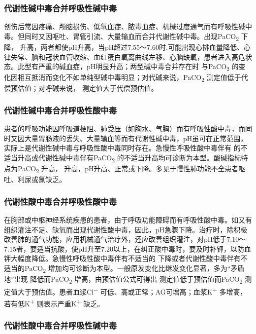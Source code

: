 \subsubsection{代谢性碱中毒合并呼吸性碱中毒}

创伤后常因疼痛、颅脑损伤、低氧血症、脓毒血症、机械过度通气而有呼吸性碱中毒。但同时又因呕吐、胃管引流、大量输血而合并代谢性碱中毒。出现PaCO\textsubscript{2}
下降，{}
升高，两者都使pH升高，当pH超过7.55～7.60时.可能出现心排血量降低、心律失常、脑和冠状血管收缩、血红蛋白氧离曲线左移、心脑缺氧，患者进入高危状态。此型有严重的碱血症，pH明显升高；两型碱中毒合并存在时{}
与PaCO\textsubscript{2}
的变化因相互抵消而变化不如单纯型碱中毒明显；对代碱来说，PaCO\textsubscript{2}
测定值低于代偿预估值；对呼碱来说，{} 测定值大于代偿预估值。

\subsubsection{代谢性碱中毒合并呼吸性酸中毒}

患者的呼吸功能因呼吸道梗阻、肺受压（如胸水、气胸）而有呼吸性酸中毒，而同时又因大量胃肠液的丢失、大量输血等而有代谢性碱中毒，pH虽可在正常范围，实际上是代谢性碱中毒与呼吸性酸中毒同时存在。急慢性呼吸性酸中毒伴有{}
的不适当升高或代谢性碱中毒伴有PaCO\textsubscript{2}
的不适当升高均可诊断为本型。酸碱指标特点为PaCO\textsubscript{2} 升高，{}
升高，pH升高、正常或下降。多见于慢性肺功能不全患者呕吐、利尿或氯缺乏。

\subsubsection{代谢性酸中毒合并呼吸性酸中毒}

在胸部或中枢神经系统疾患的患者，由于呼吸功能障碍而有呼吸性酸中毒。如又有组织灌注不足、缺氧而出现代谢性酸中毒，因此，pH急骤下降。治疗时，除积极改善肺的通气功能，应用机械通气治疗外，还应改善组织灌注，对pH低于7.10～7.15者，要适当抗酸，使pH升至7.20以上，在纠正酸中毒时，要及时补钾，以防血钾大幅度降低。急慢性呼吸性酸中毒伴有不适当的{}
下降或者代谢性酸中毒伴有不适当的PaCO\textsubscript{2}
增加均可诊断为本型。一般原发变化比继发变化显著，多为“矛盾地”出现{}
降低而PaCO\textsubscript{2} 增高，由预估值公式可得出{}
测定值低于预估值而PaCO\textsubscript{2}
测定值大于预估值。患者血浆Cl\textsuperscript{−}
可低、高或正常；AG可增高；血浆K\textsuperscript{+}
多增高，若有低K\textsuperscript{+} 则表示严重K\textsuperscript{+} 缺乏。

\subsubsection{代谢性酸中毒合并呼吸性碱中毒}

